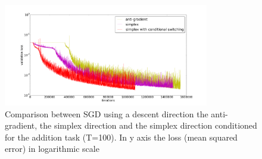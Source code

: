 \begin{figure}
	\centering
	\includegraphics[width= 0.8\textwidth]{chapter4/compare_add_simplex.png}
	\caption{Comparison between SGD using a descent direction the anti-gradient, the simplex direction and the simplex direction conditioned for the addition task (T=100). In y axis the loss (mean squared error) in logarithmic scale}
	\label{fig:comparisong_add_simplex}
\end{figure}
